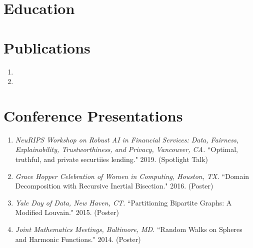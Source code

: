 \documentclass[10pt]{article} %
\begin{document}

\section{Education}





 
\section{Publications}
  \begin{enumerate}
    \item {}
    \item {}
    \end{enumerate}

\section{Conference Presentations}
\begin{enumerate}
    \item \textit{NeuRIPS Workshop on Robust AI in Financial Services: Data, Fairness, Explainability, Trustworthiness, and Privacy, Vancouver, CA.} ``Optimal, truthful, and private securtiies lending." 2019. (Spotlight Talk)
    \item \textit{Grace Hopper Celebration of Women in Computing, Houston, TX.} ``Domain Decomposition with Recursive Inertial Bisection." 2016. (Poster)
    \item \textit{Yale Day of Data, New Haven, CT.} ``Partitioning Bipartite Graphs: A Modified Louvain." 2015. (Poster)
    \item \textit{Joint Mathematics Meetings, Baltimore, MD.} ``Random Walks on Spheres and Harmonic Functions." 2014. (Poster)
\end{enumerate}
\end{document}
